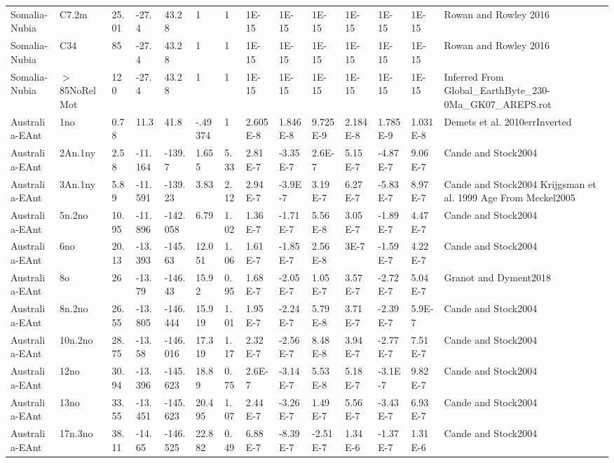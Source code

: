 \begin{landscape}
\begin{longtable}{@{}lllllllllllllp{3.5cm}@{}}
Somalia-Nubia & C7.2m & 25.01 & -27.4 & 43.28 & 1 & 1 & 1E-15 & 1E-15 & 1E-15 & 1E-15 & 1E-15 & 1E-15 & Rowan and Rowley 2016 \\
Somalia-Nubia & C34 & 85 & -27.4 & 43.28 & 1 & 1 & 1E-15 & 1E-15 & 1E-15 & 1E-15 & 1E-15 & 1E-15 & Rowan and Rowley 2016 \\
Somalia-Nubia & $>$85NoRelMot & 120 & -27.4 & 43.28 & 1 & 1 & 1E-15 & 1E-15 &
1E-15 & 1E-15 & 1E-15 & 1E-15 & Inferred From Global\_EarthByte\_230-0Ma\_GK07\_AREPS.rot \\
Australia-EAnt & 1no & 0.78 & 11.3 & 41.8 & -.49374 & 1 & 2.605E-8 & 1.846E-8 & 9.725E-9 & 2.184E-8 & 1.785E-9 & 1.031E-8 & Demets et al. 2010errInverted \\
Australia-EAnt & 2An.1ny & 2.58 & -11.164 & -139.7 & 1.655 & 5.33 & 2.81E-7 & -3.35E-7 & 2.6E-7 & 5.15E-7 & -4.87E-7 & 9.06E-7 & Cande and Stock2004 \\
Australia-EAnt & 3An.1ny & 5.89 & -11.591 & -139.23 & 3.83 & 2.12 & 2.94E-7 & -3.9E-7 & 3.19E-7 & 6.27E-7 & -5.83E-7 & 8.97E-7 & Cande and Stock2004 Krijgsman et al. 1999 Age From Meckel2005 \\
Australia-EAnt & 5n.2no & 10.95 & -11.896 & -142.058 & 6.79 & 1.02 & 1.36E-7 & -1.71E-7 & 5.56E-8 & 3.05E-7 & -1.89E-7 & 4.47E-7 & Cande and Stock2004 \\
Australia-EAnt & 6no & 20.13 & -13.393 & -145.63 & 12.051 & 1.06 & 1.61E-7 & -1.85E-7 & 2.56E-8 & 3E-7 & -1.59E-7 & 4.22E-7 & Cande and Stock2004 \\
Australia-EAnt & 8o & 26 & -13.79 & -146.43 & 15.92 & 0.95 & 1.68E-7 & -2.05E-7 & 1.05E-7 & 3.57E-7 & -2.72E-7 & 5.04E-7 & Granot and Dyment2018 \\
Australia-EAnt & 8n.2no & 26.55 & -13.805 & -146.444 & 15.919 & 1.01 & 1.95E-7 & -2.24E-7 & 5.79E-8 & 3.71E-7 & -2.39E-7 & 5.9E-7 & Cande and Stock2004 \\
Australia-EAnt & 10n.2no & 28.75 & -13.58 & -146.016 & 17.319 & 1.17 & 2.32E-7 & -2.56E-7 & 8.48E-8 & 3.94E-7 & -2.77E-7 & 7.51E-7 & Cande and Stock2004 \\
Australia-EAnt & 12no & 30.94 & -13.396 & -145.623 & 18.89 & 0.75 & 2.6E-7 & -3.14E-7 & 5.53E-8 & 5.18E-7 & -3.1E-7 & 9.82E-7 & Cande and Stock2004 \\
Australia-EAnt & 13no & 33.55 & -13.451 & -145.623 & 20.495 & 1.07 & 2.44E-7 & -3.26E-7 & 1.49E-7 & 5.56E-7 & -3.43E-7 & 6.93E-7 & Cande and Stock2004 \\
Australia-EAnt & 17n.3no & 38.11 & -14.65 & -146.525 & 22.882 & 0.49 & 6.88E-7 & -8.39E-7 & -2.51E-7 & 1.34E-6 & -1.37E-7 & 1.31E-6 & Cande and Stock2004 \\

\end{longtable}
\end{landscape}
